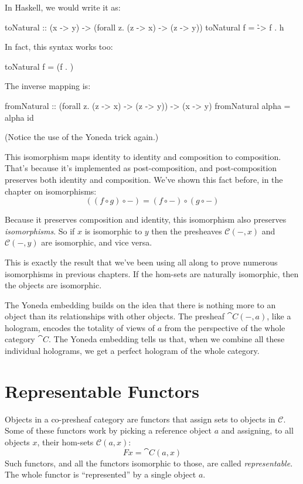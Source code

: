 \documentclass[DaoFP]{subfiles}
\begin{document}
In Haskell, we would write it as:
\begin{haskell}
toNatural :: (x -> y) -> (forall z. (z -> x) -> (z -> y))
toNatural f = \h -> f . h 
\end{haskell}
In fact, this syntax works too:
\begin{haskell}
toNatural f = (f . )
\end{haskell}
The inverse mapping is:
\begin{haskell}
fromNatural :: (forall z. (z -> x) -> (z -> y)) -> (x -> y)
fromNatural alpha = alpha id
\end{haskell}
(Notice the use of the Yoneda trick again.)

This isomorphism maps identity to identity and composition to composition. That's because it's implemented as post-composition, and post-composition preserves both identity and composition. We've shown this fact before, in the chapter on isomorphisms:
\[ ((f \circ g) \circ -) = (f \circ -) \circ (g \circ -) \]

Because it preserves composition and identity, this isomorphism also preserves \emph{isomorphisms}. So if $x$ is isomorphic to $y$ then the presheaves $ \mathcal{C}(-, x)$ and $ \mathcal{C}(-, y)$ are isomorphic, and vice versa. 

This is exactly the result that we've been using all along to prove numerous isomorphisms in previous chapters. If the hom-sets are naturally isomorphic, then the objects are isomorphic. 

The Yoneda embedding builds on the idea that there is nothing more to an object than its relationships with other objects. The presheaf $\cat C (-, a)$, like a hologram, encodes the totality of views of $a$ from the perspective of the whole category $\cat C$. The Yoneda embedding tells us that, when we combine all these individual holograms, we get a perfect hologram of the whole category.

\section{Representable Functors}

Objects in a  co-presheaf category are functors that assign sets to objects in $\mathcal{C}$. Some of these functors work by picking a reference object $a$ and assigning,  to all objects $x$, their hom-sets  $\mathcal{C}(a, x)$:
\[ F x = \cat C(a, x) \]
Such functors, and all the functors isomorphic to those, are called \emph{representable}. The whole functor is ``represented'' by a single object $a$. 
\end{document}
